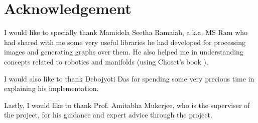 \documentclass[12pt]{article}
\begin{document}
% 
% 

 

\section{Acknowledgement}
I would like to specially thank Mamidela Seetha Ramaiah, a.k.a. MS Ram who had shared with me some very useful libraries he had developed for processing images and generating graphs over them. He also helped me in understanding concepts related to robotics and manifolds (using Choset's book \cite{choset}).

I would also like to thank Debojyoti Das for spending some very precious time in explaining his implementation.

Lastly, I would like to thank Prof. Amitabha Mukerjee, who is the superviser of the project, for his guidance and expert advice through the project.
\end{document}
